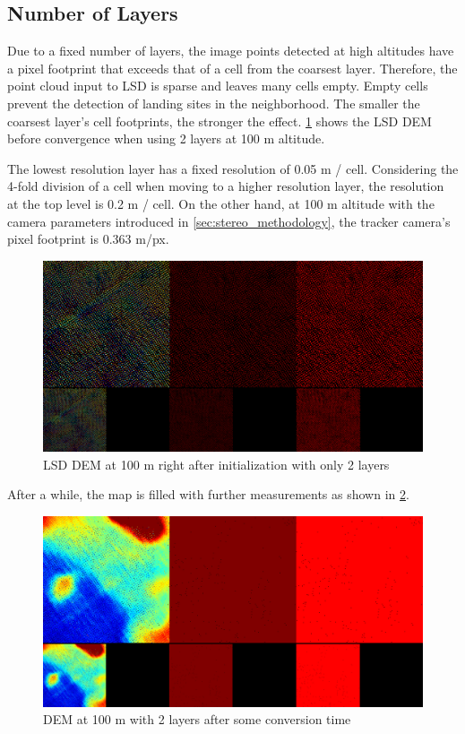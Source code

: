 \subsection{Number of Layers}

Due to a fixed number of layers, the image points detected at high altitudes have a pixel footprint that exceeds that of a cell from the coarsest layer. Therefore, the point cloud input to LSD is sparse and leaves many cells empty. Empty cells prevent the detection of landing sites in the neighborhood. The smaller the coarsest layer's cell footprints, the stronger the effect. \cref{fig:lsd_2_layers_1} shows the LSD DEM before convergence when using 2 layers at 100 m altitude.

The lowest resolution layer has a fixed resolution of 0.05 m / cell. Considering the 4-fold division of a cell when moving to a higher resolution layer, the resolution at the top level is 0.2 m / cell. On the other hand, at 100 m altitude with the camera parameters introduced in \cref{sec:stereo_methodology}, the tracker camera's pixel footprint is 0.363 m/px. 

\begin{figure}[h]
\centering
\includegraphics[scale=0.24]{images/evaluation/2_layers_1.png}
\caption{LSD DEM at 100 m right after initialization with only 2 layers}
\label{fig:lsd_2_layers_1}
\end{figure}

After a while, the map is filled with further measurements as shown in \cref{fig:lsd_2_layers_2}.


\begin{figure}[h]
\centering
\includegraphics[scale=0.24]{images/evaluation/2_layers_2.png}
\caption{DEM at 100 m with 2 layers after some conversion time}
\label{fig:lsd_2_layers_2}
\end{figure}

